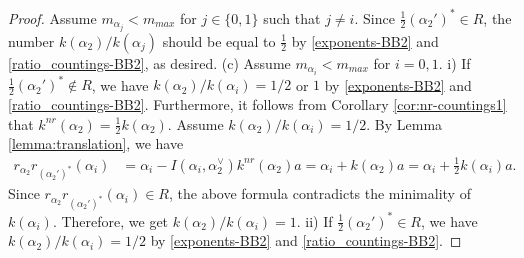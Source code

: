 \documentclass[11pt]{amsart}
\newcommand{\w}{\mathrm{w}}
\newcommand{\nw}{\mathrm{nw}}
\begin{document}
{{\begin{proof}
Assume $m_{\alpha_j}<m_{max}$ for $j\in \{0,1\}$ such that $j\ne i$. 
Since $\tfrac12 (\alpha_2')^\ast\in R$, the number $k(\alpha_2)/k(\alpha_j)$ should
be equal to $\tfrac12$ by \eqref{exponents-BB2} and \eqref{ratio_countings-BB2}, 
as desired. 
\vskip 3mm
\noindent
(c) Assume $m_{\alpha_i}<m_{max}$ for $i=0,1$. 
\vskip 1mm
\noindent
i) If $\tfrac12 (\alpha_2')^\ast\not\in R$, we have $k(\alpha_2)/k(\alpha_i)=1/2$ or 
$1$ by \eqref{exponents-BB2} and \eqref{ratio_countings-BB2}. 
Furthermore, it follows from Corollary \ref{cor:nr-countings1} that 
$k^{nr}(\alpha_2)=\frac12 k(\alpha_2)$. 
Assume $k(\alpha_2)/k(\alpha_i)=1/2$. By Lemma \ref{lemma:translation}, we have 
\begin{align*}
r_{\alpha_2}r_{(\alpha_2')^\ast}(\alpha_i)
&=\alpha_i-I(\alpha_i,\alpha_2^\vee)k^{nr}(\alpha_2)a
=\alpha_i+k(\alpha_2)a
=\alpha_i+\frac12 k(\alpha_i)a.
\end{align*}
Since $r_{\alpha_2}r_{(\alpha_2')^\ast}(\alpha_i)\in R$, the above formula 
contradicts 
the minimality of $k(\alpha_i)$. Therefore, we get  $k(\alpha_2)/k(\alpha_i)=1$.
\vskip 1mm
\noindent
ii) If $\tfrac12 (\alpha_2')^\ast\in R$, we have $k(\alpha_2)/k(\alpha_i)=1/2$  by 
\eqref{exponents-BB2} and \eqref{ratio_countings-BB2}. 

\end{proof}}}
\end{document}
